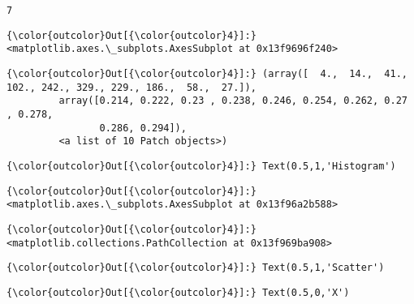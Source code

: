 \documentclass[11pt]{article}
\begin{document}
    \begin{Verbatim}[commandchars=\\\{\}]
7

    \end{Verbatim}

\begin{Verbatim}[commandchars=\\\{\}]
{\color{outcolor}Out[{\color{outcolor}4}]:} <matplotlib.axes.\_subplots.AxesSubplot at 0x13f9696f240>
\end{Verbatim}
            
\begin{Verbatim}[commandchars=\\\{\}]
{\color{outcolor}Out[{\color{outcolor}4}]:} (array([  4.,  14.,  41., 102., 242., 329., 229., 186.,  58.,  27.]),
         array([0.214, 0.222, 0.23 , 0.238, 0.246, 0.254, 0.262, 0.27 , 0.278,
                0.286, 0.294]),
         <a list of 10 Patch objects>)
\end{Verbatim}
            
\begin{Verbatim}[commandchars=\\\{\}]
{\color{outcolor}Out[{\color{outcolor}4}]:} Text(0.5,1,'Histogram')
\end{Verbatim}
            
\begin{Verbatim}[commandchars=\\\{\}]
{\color{outcolor}Out[{\color{outcolor}4}]:} <matplotlib.axes.\_subplots.AxesSubplot at 0x13f96a2b588>
\end{Verbatim}
            
\begin{Verbatim}[commandchars=\\\{\}]
{\color{outcolor}Out[{\color{outcolor}4}]:} <matplotlib.collections.PathCollection at 0x13f969ba908>
\end{Verbatim}
            
\begin{Verbatim}[commandchars=\\\{\}]
{\color{outcolor}Out[{\color{outcolor}4}]:} Text(0.5,1,'Scatter')
\end{Verbatim}
            
\begin{Verbatim}[commandchars=\\\{\}]
{\color{outcolor}Out[{\color{outcolor}4}]:} Text(0.5,0,'X')
\end{Verbatim}
            
\end{document}
